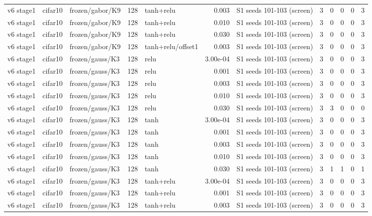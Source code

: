 \begin{table}[htbp]
{\begin{tabular}{@{}lllrlrlrrrrr@{}}
v6 stage1 & cifar10 & frozen/gabor/K9 & 128 & tanh+relu & 0.003 & S1 seeds 101-103 (screen) & 3 & 0 & 0 & 0 & 3 \\
v6 stage1 & cifar10 & frozen/gabor/K9 & 128 & tanh+relu & 0.010 & S1 seeds 101-103 (screen) & 3 & 0 & 0 & 0 & 3 \\
v6 stage1 & cifar10 & frozen/gabor/K9 & 128 & tanh+relu & 0.030 & S1 seeds 101-103 (screen) & 3 & 0 & 0 & 0 & 3 \\
v6 stage1 & cifar10 & frozen/gabor/K9 & 128 & tanh+relu/offset1 & 0.003 & S1 seeds 101-103 (screen) & 3 & 0 & 0 & 0 & 3 \\
v6 stage1 & cifar10 & frozen/gauss/K3 & 128 & relu & 3.00e-04 & S1 seeds 101-103 (screen) & 3 & 0 & 0 & 0 & 3 \\
v6 stage1 & cifar10 & frozen/gauss/K3 & 128 & relu & 0.001 & S1 seeds 101-103 (screen) & 3 & 0 & 0 & 0 & 3 \\
v6 stage1 & cifar10 & frozen/gauss/K3 & 128 & relu & 0.003 & S1 seeds 101-103 (screen) & 3 & 0 & 0 & 0 & 3 \\
v6 stage1 & cifar10 & frozen/gauss/K3 & 128 & relu & 0.010 & S1 seeds 101-103 (screen) & 3 & 0 & 0 & 0 & 3 \\
v6 stage1 & cifar10 & frozen/gauss/K3 & 128 & relu & 0.030 & S1 seeds 101-103 (screen) & 3 & 3 & 0 & 0 & 0 \\
v6 stage1 & cifar10 & frozen/gauss/K3 & 128 & tanh & 3.00e-04 & S1 seeds 101-103 (screen) & 3 & 0 & 0 & 0 & 3 \\
v6 stage1 & cifar10 & frozen/gauss/K3 & 128 & tanh & 0.001 & S1 seeds 101-103 (screen) & 3 & 0 & 0 & 0 & 3 \\
v6 stage1 & cifar10 & frozen/gauss/K3 & 128 & tanh & 0.003 & S1 seeds 101-103 (screen) & 3 & 0 & 0 & 0 & 3 \\
v6 stage1 & cifar10 & frozen/gauss/K3 & 128 & tanh & 0.010 & S1 seeds 101-103 (screen) & 3 & 0 & 0 & 0 & 3 \\
v6 stage1 & cifar10 & frozen/gauss/K3 & 128 & tanh & 0.030 & S1 seeds 101-103 (screen) & 3 & 1 & 1 & 0 & 1 \\
v6 stage1 & cifar10 & frozen/gauss/K3 & 128 & tanh+relu & 3.00e-04 & S1 seeds 101-103 (screen) & 3 & 0 & 0 & 0 & 3 \\
v6 stage1 & cifar10 & frozen/gauss/K3 & 128 & tanh+relu & 0.001 & S1 seeds 101-103 (screen) & 3 & 0 & 0 & 0 & 3 \\
v6 stage1 & cifar10 & frozen/gauss/K3 & 128 & tanh+relu & 0.003 & S1 seeds 101-103 (screen) & 3 & 0 & 0 & 0 & 3 \\

\end{tabular}}
\end{table}
